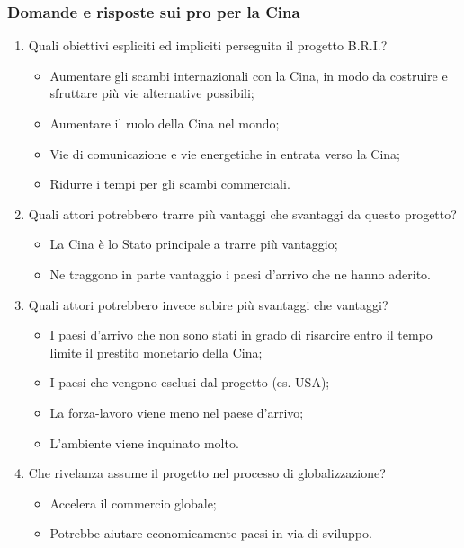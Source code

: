 \documentclass{article}
\begin{document}
\subsubsection{Domande e risposte sui pro per la Cina}
\begin{enumerate}
    \item Quali obiettivi espliciti ed impliciti perseguita il progetto B.R.I.?
        \begin{itemize}
            \item Aumentare gli scambi internazionali con la Cina, in modo da costruire e
                sfruttare più vie alternative possibili;
            \item Aumentare il ruolo della Cina nel mondo;
            \item Vie di comunicazione e vie energetiche in entrata verso la Cina;
            \item Ridurre i tempi per gli scambi commerciali.
        \end{itemize}
    \item Quali attori potrebbero trarre più vantaggi che svantaggi da questo progetto?
        \begin{itemize}
            \item La Cina è lo Stato principale a trarre più vantaggio;
            \item Ne traggono in parte vantaggio i paesi d'arrivo che ne hanno aderito.
        \end{itemize}
    \item Quali attori potrebbero invece subire più svantaggi che vantaggi?
        \begin{itemize}
            \item I paesi d'arrivo che non sono stati in grado di risarcire entro il tempo
                limite il prestito monetario della Cina;
            \item I paesi che vengono esclusi dal progetto (es. USA);
            \item La forza-lavoro viene meno nel paese d'arrivo;
            \item L'ambiente viene inquinato molto.
        \end{itemize}
    \item Che rivelanza assume il progetto nel processo di globalizzazione?
        \begin{itemize}
            \item Accelera il commercio globale;
            \item Potrebbe aiutare economicamente paesi in via di sviluppo.
        \end{itemize}
\end{enumerate}
\end{document}
